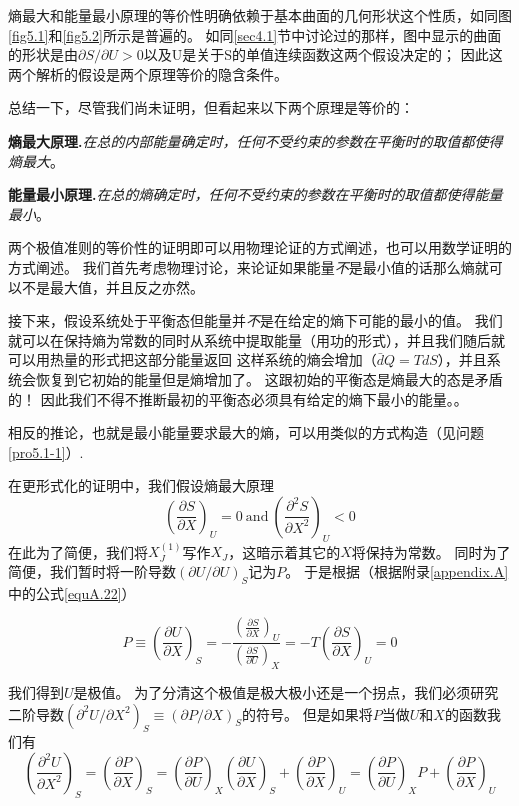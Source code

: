 熵最大和能量最小原理的等价性明确依赖于基本曲面的几何形状这个性质，如同图\ref{fig5.1}和\ref{fig5.2}所示是普遍的。
如同\ref{sec4.1}节中讨论过的那样，图中显示的曲面的形状是由$\partial S/\partial U>0$以及U是关于S的单值连续函数这两个假设决定的；
因此这两个解析的假设是两个原理等价的隐含条件。

总结一下，尽管我们尚未证明，但看起来以下两个原理是等价的：

{\bf 熵最大原理.}{\it 在总的内部能量确定时，任何不受约束的参数在平衡时的取值都使得熵最大}。

{\bf 能量最小原理.}{\it 在总的熵确定时，任何不受约束的参数在平衡时的取值都使得能量最小}。

两个极值准则的等价性的证明即可以用物理论证的方式阐述，也可以用数学证明的方式阐述。
我们首先考虑物理讨论，来论证如果能量{\it 不}是最小值的话那么熵就可以不是最大值，并且反之亦然。

接下来，假设系统处于平衡态但能量并{\it 不}是在给定的熵下可能的最小的值。
我们就可以在保持熵为常数的同时从系统中提取能量（用功的形式），并且我们随后就可以用热量的形式把这部分能量返回
这样系统的熵会增加（$\bar{d}Q=TdS$），并且系统会恢复到它初始的能量但是熵增加了。
这跟初始的平衡态是熵最大的态是矛盾的！
因此我们不得不推断最初的平衡态必须具有给定的熵下最小的能量。。

相反的推论，也就是最小能量要求最大的熵，可以用类似的方式构造（见问题 \ref{pro5.1-1}）.

在更形式化的证明中，我们假设熵最大原理
\begin{equation}
\label{equ5.1}
\left(\frac{\partial S}{\partial X}\right)_U=0
~\text{and}~
\left(\frac{\partial^2 S}{\partial X^2}\right)_U<0
\end{equation}
在此为了简便，我们将$X_J^{(1)}$写作$X_J$，这暗示着其它的$X$将保持为常数。
同时为了简便，我们暂时将一阶导数$(\partial U/\partial U)_S$记为$P$。
于是根据（根据附录\ref{appendix.A}中的公式\eqref{equA.22}）

\begin{equation}
\label{equ5.2}
	P \equiv \left( \frac{\partial U}{\partial X} \right)_S = -\frac{\left( \frac{\partial S}{\partial X} \right)_U }{ \left( \frac{\partial S}{\partial U}\right)_X } = -T \left(\frac{\partial S}{\partial X}\right)_U = 0
\end{equation}

我们得到$U$是极值。
为了分清这个极值是极大极小还是一个拐点，我们必须研究二阶导数$(\partial^2U/\partial X^2)_S\equiv(\partial P/\partial X)_S$的符号。
但是如果将$P$当做$U$和$X$的函数我们有
\begin{equation}
\label{equ5.3}
\left(\frac{\partial^2 U}{\partial X^2}\right)_S
=\left(\frac{\partial P}{\partial X}\right)_S
=\left(\frac{\partial P}{\partial U}\right)_X
\left(\frac{\partial U}{\partial X}\right)_S
+\left(\frac{\partial P}{\partial X}\right)_U
=\left(\frac{\partial P}{\partial U}\right)_XP
+\left(\frac{\partial P}{\partial X}\right)_U
\end{equation}


